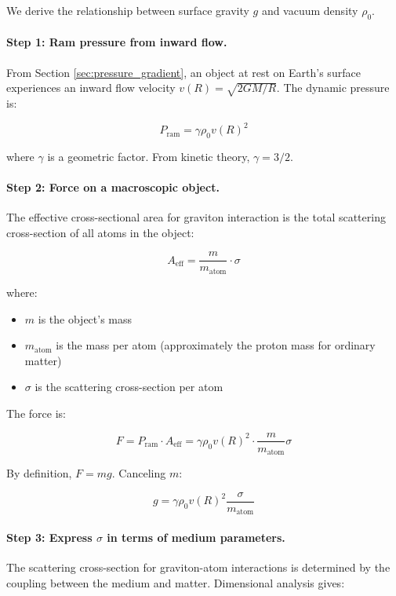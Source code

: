 \documentclass[12pt, a4paper]{article}
\begin{document}
We derive the relationship between surface gravity \( g \) and vacuum density \( \rho_0 \).

\paragraph{Step 1: Ram pressure from inward flow.}

From Section \ref{sec:pressure_gradient}, an object at rest on Earth's surface experiences an inward flow velocity \( v(R) = \sqrt{2GM/R} \). The dynamic pressure is:

\[
P_{\text{ram}} = \gamma \rho_0 v(R)^2
\]

where \( \gamma \) is a geometric factor. From kinetic theory, \( \gamma = 3/2 \).

\paragraph{Step 2: Force on a macroscopic object.}

The effective cross-sectional area for graviton interaction is the total scattering cross-section of all atoms in the object:

\[
A_{\text{eff}} = \frac{m}{m_{\text{atom}}} \cdot \sigma
\]

where:
\begin{itemize}
    \item \( m \) is the object's mass
    \item \( m_{\text{atom}} \) is the mass per atom (approximately the proton mass for ordinary matter)
    \item \( \sigma \) is the scattering cross-section per atom
\end{itemize}

The force is:

\[
F = P_{\text{ram}} \cdot A_{\text{eff}} = \gamma \rho_0 v(R)^2 \cdot \frac{m}{m_{\text{atom}}} \sigma
\]

By definition, \( F = mg \). Canceling \( m \):

\[
g = \gamma \rho_0 v(R)^2 \frac{\sigma}{m_{\text{atom}}}
\]

\paragraph{Step 3: Express \( \sigma \) in terms of medium parameters.}

The scattering cross-section for graviton-atom interactions is determined by the coupling between the medium and matter. Dimensional analysis gives:
\end{document}
